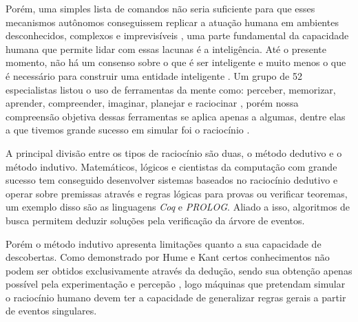 Porém, uma simples lista de comandos não seria suficiente para que esses
mecanismos autônomos conseguissem replicar a atuação humana em ambientes
desconhecidos, complexos e imprevisíveis \cite{russell2016artificial}, uma
parte fundamental da capacidade humana que permite lidar com essas lacunas é a
inteligência. Até o presente momento, não há um consenso sobre o que é ser
inteligente e muito menos o que é necessário para construir uma entidade
inteligente \cite{russell2016artificial}. Um grupo de 52 especialistas listou o
uso de ferramentas da mente como: perceber, memorizar, aprender, compreender,
imaginar, planejar e raciocinar \cite{gottfredson1997mainstream}, porém nossa
compreensão objetiva dessas ferramentas se aplica apenas a algumas, dentre elas
a que tivemos grande sucesso em simular foi o raciocínio
\cite{russell2016artificial}.

A principal divisão entre os tipos de raciocínio são duas, o método dedutivo e
o método indutivo. Matemáticos, lógicos e cientistas da computação com grande
sucesso tem conseguido desenvolver sistemas baseados no raciocínio dedutivo e
operar sobre premissas através e regras lógicas para provas ou verificar
teoremas, um exemplo disso são as linguagens \textit{Coq} e \textit{PROLOG}.
Aliado a isso, algoritmos de busca permitem deduzir soluções pela verificação
da árvore de eventos.

Porém o método indutivo apresenta limitações quanto a sua capacidade de
descobertas. Como demonstrado por Hume \cite{hume2000enquiry} e Kant
\cite{smith2011immanuel} certos conhecimentos não podem ser obtidos
exclusivamente através da dedução, sendo sua obtenção apenas possível pela
experimentação e percepão \cite{popper2005logic}, logo máquinas que pretendam
simular o raciocínio humano devem ter a capacidade de generalizar regras gerais
a partir de eventos singulares.


